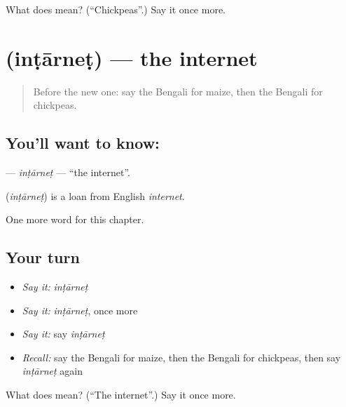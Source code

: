 \begin{tcolorbox}[breakable,colback=teal!4,colframe=teal!35!black,title={Before you move on}]
What does  mean? (\textquotedblleft{}Chickpeas\textquotedblright{}.) Say it once more.
\end{tcolorbox}
\section[\texorpdfstring{\bn{ইন্টারনেট} (inṭārneṭ)}{ইন্টারনেট (inṭārneṭ)}]{ (inṭārneṭ) — the internet}

\label{lesson:BN-C232-intarnet}



\begin{quote}
Before the new one: say the Bengali for maize, then the Bengali for chickpeas.
\end{quote}

\subsection*{You'll want to know: }
\textbf{} — \emph{inṭārneṭ} — \textquotedblleft{}the internet\textquotedblright{}.

\begin{cousinweb}
\textbf{} (\emph{inṭārneṭ}) is a loan from English \emph{internet}.
\end{cousinweb}

\begin{grammarlens}[title={What you've built}]
One more word for this chapter.
\end{grammarlens}

\subsection*{Your turn}
\begin{itemize}
\raggedright
  \item \emph{Say it:} \emph{inṭārneṭ}
  \item \emph{Say it:} \emph{inṭārneṭ}, once more
  \item \emph{Say it:} say \emph{inṭārneṭ}
  \item \emph{Recall:} say the Bengali for maize, then the Bengali for chickpeas, then say \emph{inṭārneṭ} again
\end{itemize}

\begin{tcolorbox}[breakable,colback=teal!4,colframe=teal!35!black,title={Before you move on}]
What does  mean? (\textquotedblleft{}The internet\textquotedblright{}.) Say it once more.
\end{tcolorbox}
